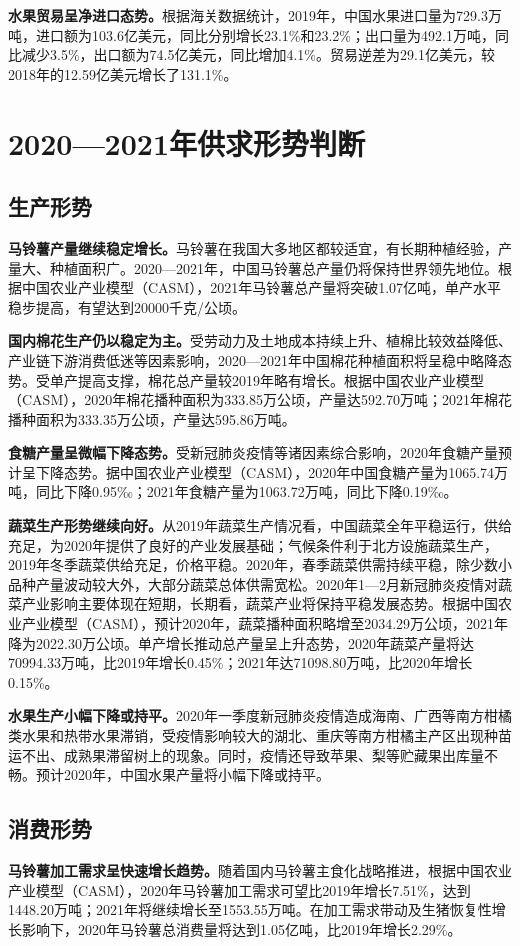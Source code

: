 \documentclass{progbookcn}
\begin{document}
\textbf{水果贸易呈净进口态势。}根据海关数据统计，2019年，中国水果进口量为729.3万吨，进口额为103.6亿美元，同比分别增长23.1\%和23.2\%；出口量为492.1万吨，同比减少3.5\%，出口额为74.5亿美元，同比增加4.1\%。贸易逆差为29.1亿美元，较2018年的12.59亿美元增长了131.1\%。

\section{2020—2021年供求形势判断}
\subsection{生产形势}
\textbf{马铃薯产量继续稳定增长。}马铃薯在我国大多地区都较适宜，有长期种植经验，产量大、种植面积广。2020—2021年，中国马铃薯总产量仍将保持世界领先地位。根据中国农业产业模型（CASM），2021年马铃薯总产量将突破1.07亿吨，单产水平稳步提高，有望达到20000千克/公顷。

\textbf{国内棉花生产仍以稳定为主。}受劳动力及土地成本持续上升、植棉比较效益降低、产业链下游消费低迷等因素影响，2020—2021年中国棉花种植面积将呈稳中略降态势。受单产提高支撑，棉花总产量较2019年略有增长。根据中国农业产业模型（CASM），2020年棉花播种面积为333.85万公顷，产量达592.70万吨；2021年棉花播种面积为333.35万公顷，产量达595.86万吨。

\textbf{食糖产量呈微幅下降态势。}受新冠肺炎疫情等诸因素综合影响，2020年食糖产量预计呈下降态势。据中国农业产业模型（CASM），2020年中国食糖产量为1065.74万吨，同比下降0.95‰；2021年食糖产量为1063.72万吨，同比下降0.19‰。

\textbf{蔬菜生产形势继续向好。}从2019年蔬菜生产情况看，中国蔬菜全年平稳运行，供给充足，为2020年提供了良好的产业发展基础；气候条件利于北方设施蔬菜生产，2019年冬季蔬菜供给充足，价格平稳。2020年，春季蔬菜供需持续平稳，除少数小品种产量波动较大外，大部分蔬菜总体供需宽松。2020年1—2月新冠肺炎疫情对蔬菜产业影响主要体现在短期，长期看，蔬菜产业将保持平稳发展态势。根据中国农业产业模型（CASM），预计2020年，蔬菜播种面积略增至2034.29万公顷，2021年降为2022.30万公顷。单产增长推动总产量呈上升态势，2020年蔬菜产量将达70994.33万吨，比2019年增长0.45\%；2021年达71098.80万吨，比2020年增长0.15\%。

\textbf{水果生产小幅下降或持平。}2020年一季度新冠肺炎疫情造成海南、广西等南方柑橘类水果和热带水果滞销，受疫情影响较大的湖北、重庆等南方柑橘主产区出现种苗运不出、成熟果滞留树上的现象。同时，疫情还导致苹果、梨等贮藏果出库量不畅。预计2020年，中国水果产量将小幅下降或持平。

\subsection{消费形势}
\textbf{马铃薯加工需求呈快速增长趋势。}随着国内马铃薯主食化战略推进，根据中国农业产业模型（CASM），2020年马铃薯加工需求可望比2019年增长7.51\%，达到1448.20万吨；2021年将继续增长至1553.55万吨。在加工需求带动及生猪恢复性增长影响下，2020年马铃薯总消费量将达到1.05亿吨，比2019年增长2.29\%。
\end{document}

